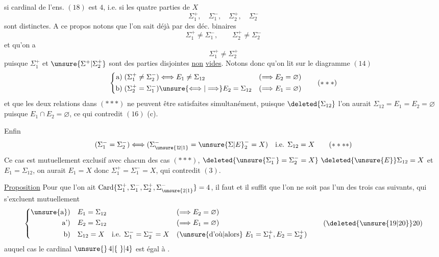 \begingroup\makeatletter\tagsleft@true\makeatother
si  cardinal de l'ens. $(18)$ est $4$, i.e. si les quatre parties de $X$
\[
\Sigma_1^+,\quad\Sigma_1^-,\quad\Sigma_2^+,\quad\Sigma_2^-
\]
sont distinctes. A ce propos notons que l'on sait déjà par   des déc. binaires
\[
\Sigma_1^+\ne\Sigma_1^-,\qquad\Sigma_2^+\ne\Sigma_2^-
\tag*{($*$)}
\]
et qu'on a
\[
\Sigma_1^+\ne\Sigma_2^+
\tag*{($**$)}
\]
puisque $\Sigma_1^+$ et $\unsure{\Sigma^+|\Sigma_2^+}$ sont des parties disjointes \uline{non} \uline{vides}. Notons donc qu'on lit sur le diagramme $(14)$
\[
\left\{\begin{aligned}
\text{a)}\;(\Sigma_1^+\ne\Sigma_2^-)&\Longleftrightarrow E_1\ne\Sigma_{12}
   &(\Longrightarrow E_2=\varnothing)\\
\text{b)}\;(\Sigma_2^+=\Sigma_1^-)&\unsure{\Longleftrightarrow|\Longrightarrow} E_2=\Sigma_{12}
   &(\Longrightarrow E_1=\varnothing)
\end{aligned}\right.
\tag*{($***$)}
\]
et que les deux relations   dans $(***)$ ne peuvent être satisfaites simultanément, puisque $\deleted{\Sigma_{12}}$ l'on aurait $\Sigma_{12}=E_1=E_2=\varnothing$ puisque $E_1\cap E_2=\varnothing$, ce qui contredit $(16)$ (c).

Enfin
\[
(\Sigma_1^-=\Sigma_2^-)\Longleftrightarrow
(\Sigma_{\unsure{1\!2|1}}^-={\unsure{\Sigma|E}}_2^-=X)
\quad\text{i.e. }\Sigma_{12}=X
\tag*{($****$)}
\]
Ce cas est mutuellement exclusif avec chacun des cas $(***)$,   $\deleted{\unsure{\Sigma_1^-}=\Sigma_2^-=X}\ \deleted{\unsure{E}}\Sigma_{12}=X$ et $E_1=\Sigma_{12}$, on aurait $E_1=X$ donc $\Sigma_1^+=\Sigma_1^-=X$,  qui contredit $(3)$.

\uline{Proposition} Pour que l'on ait $\operatorname{Card}\{\Sigma_1^+,\Sigma_1^-,\Sigma_2^+,\Sigma_{\unsure{2|1}}^-\}=4$, il faut et il suffit que l'on ne soit pas l'un des trois cas suivants, qui s'excluent mutuellement
\[
\left\{\begin{aligned}
\text{\unsure{a})}\quad &E_1=\Sigma_{12}&&(\Longrightarrow E_2=\varnothing)\\
\text{a')}\quad &E_2=\Sigma_{12}&&(\Longrightarrow E_1=\varnothing)\\
\text{b)}\quad &\Sigma_{12}=X\quad\text{i.e. }\Sigma_1^-=\Sigma_2^-=X
   &&(\text{\unsure{d'où|alors} }E_1=\Sigma_1^+,E_2=\Sigma_2^+)
\end{aligned}\right.
\tag*{(\deleted{\unsure{19|20}}20)}
\]
auquel cas le cardinal  $\unsure{\}\,4|\{\ \}|4}$ est égal à .

\endgroup
\clearpage
